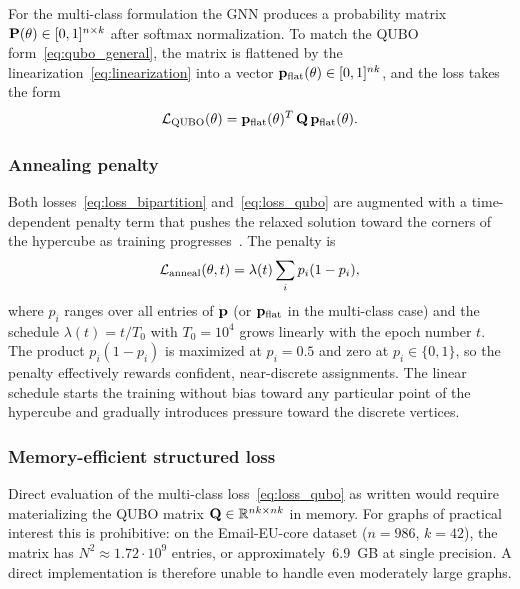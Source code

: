 For the multi-class formulation the GNN produces a probability
matrix $\mathbf{P}(\theta) \in [0,1]^{n \times k}$ after softmax
normalization. To match the QUBO form~\eqref{eq:qubo_general}, the
matrix is flattened by the linearization~\eqref{eq:linearization}
into a vector $\mathbf{p}_{\mathrm{flat}}(\theta) \in [0,1]^{nk}$, and the
loss takes the form
\begin{equation}
    \mathcal{L}_{\mathrm{QUBO}}(\theta) = \mathbf{p}_{\mathrm{flat}}(\theta)^T
    \, \mathbf{Q} \, \mathbf{p}_{\mathrm{flat}}(\theta).
    \label{eq:loss_qubo}
\end{equation}


\subsubsection{Annealing penalty}
\label{sec:method_annealing}

Both losses~\eqref{eq:loss_bipartition} and~\eqref{eq:loss_qubo}
are augmented with a time-dependent penalty term that pushes the
relaxed solution toward the corners of the hypercube as training
progresses~\cite{schuetz2022combinatorial}. The penalty is
\begin{equation}
    \mathcal{L}_{\mathrm{anneal}}(\theta, t) = \lambda(t) \sum_{i}
    p_i (1 - p_i),
    \label{eq:loss_anneal}
\end{equation}
where $p_i$ ranges over all entries of $\mathbf{p}$ (or
$\mathbf{p}_{\mathrm{flat}}$ in the multi-class case) and the schedule
$\lambda(t) = t / T_0$ with $T_0 = 10^4$ grows linearly with the
epoch number $t$. The product $p_i (1 - p_i)$ is maximized at
$p_i = 0.5$ and zero at $p_i \in \{0, 1\}$, so the penalty
effectively rewards confident, near-discrete assignments. The
linear schedule starts the training without bias toward any
particular point of the hypercube and gradually introduces
pressure toward the discrete vertices.


\subsubsection{Memory-efficient structured loss}
\label{sec:method_efficient}

Direct evaluation of the multi-class
loss~\eqref{eq:loss_qubo} as written would require materializing
the QUBO matrix $\mathbf{Q} \in \mathbb{R}^{nk \times nk}$ in memory. For
graphs of practical interest this is prohibitive: on the
Email-EU-core dataset ($n = 986$, $k = 42$), the matrix has
$N^2 \approx 1.72 \cdot 10^9$ entries, or approximately~$6.9$~GB
at single precision. A direct implementation is therefore unable
to handle even moderately large graphs.

